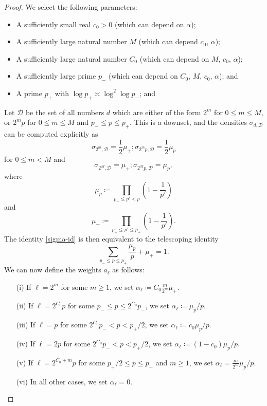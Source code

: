 \documentclass[12pt,a4paper,reqno]{amsart}
\numberwithin{equation}{section}
\theoremstyle{plain}
\theoremstyle{definition}
\begin{document}
\begin{proof}  We select the following parameters:
  \begin{itemize}
  \item A sufficiently small real $c_0>0$ (which can depend on $\alpha$);
  \item A sufficiently large natural number $M$ (which can depend $c_0$, $\alpha$);
  \item A sufficiently large natural number $C_0$ (which can depend on $M$, $c_0$, $\alpha$);
  \item A sufficiently large prime $p_-$ (which can depend on $C_0$, $M$, $c_0$, $\alpha$); and
  \item A prime $p_+$ with $\log p_+ \asymp \log^2 \log p_-$; and
  \end{itemize}
Let ${\mathcal D}$ be the set of all numbers $d$ which are either of the form $2^m$ for $0 \leq m \leq M$, or $2^m p$ for $0 \leq m \leq M$ and $p_- \leq p \leq p_+$.  This is a downset, and the densities $\sigma_{d,{\mathcal D}}$ can be computed explicitly as
$$ \sigma_{2^m,{\mathcal D}} = \frac{1}{2} \mu_+; \sigma_{2^m p,{\mathcal D}} = \frac{1}{2} \mu_p$$
for $0 \leq m < M$ and
$$ \sigma_{2^M,{\mathcal D}} = \mu_+; \sigma_{2^M p,{\mathcal D}} = \mu_p,$$
where
$$ \mu_p \coloneqq \prod_{p_- \leq p' < p} \left( 1 - \frac{1}{p'} \right)$$
and
$$ \mu_+ \coloneqq \prod_{p_- \leq p' \leq p_+} \left( 1 - \frac{1}{p'} \right).$$
The identity \eqref{sigma-id} is then equivalent to the telescoping identity
\begin{equation}\label{telescope}
   \sum_{p_- \leq p \leq p_+} \frac{\mu_p}{p} + \mu_+ = 1.
\end{equation}
We can now define the weights $a_\ell$ as follows:
\begin{itemize}
\item[(i)] If $\ell = 2^m$ for some $m \geq 1$, we set $\alpha_\ell \coloneqq C_0 \frac{m}{2^m} \mu_+$.
\item[(ii)] If $\ell = 2^{C_0} p$ for some $p_- \leq p \leq 2^{C_0} p_-$, we set $\alpha_\ell \coloneqq \mu_p/p$.
\item[(iii)] If $\ell = p$ for some $2^{C_0} p_- < p < p_+/2$, we set $\alpha_\ell \coloneqq c_0 \mu_p/p$.
\item[(iv)] If $\ell = 2p$ for some $2^{C_0} p_- < p < p_+/2$, we set $\alpha_\ell \coloneqq (1-c_0) \mu_p/p$.
\item[(v)] If $\ell = 2^{C_0+m} p$ for some $p_+/2 \leq p \leq p_+$ and $m \geq 1$, we set $\alpha_\ell = \frac{m}{2^m} \mu_p/p$.
\item[(vi)] In all other cases, we set $\alpha_\ell = 0$.
\end{itemize}


\end{proof}
\end{document}
